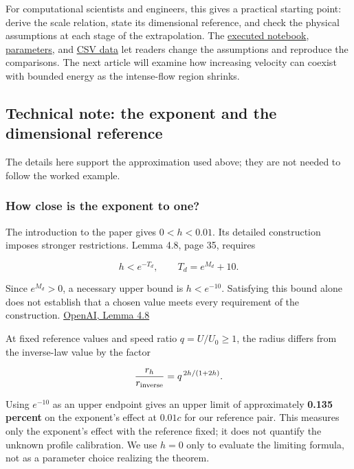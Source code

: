 \documentclass[
  english,
  11pt,
]{article}
\begin{document}
For computational scientists and engineers, this gives a practical
starting point: derive the scale relation, state its dimensional
reference, and check the physical assumptions at each stage of the
extrapolation. The \href{../../code/d1_core_size/study.ipynb}{executed
notebook}, \href{../../code/d1_core_size/parameters.json}{parameters},
and \href{../../code/d1_core_size/data/}{CSV data} let readers change
the assumptions and reproduce the comparisons. The next article will
examine how increasing velocity can coexist with bounded energy as the
intense-flow region shrinks.

\subsection{Technical note: the exponent and the dimensional
reference}\label{technical-note}

The details here support the approximation used above; they are not
needed to follow the worked example.

\subsubsection{How close is the exponent to
one?}\label{how-close-is-the-exponent-to-one}

The introduction to the paper gives \(0<h<0.01\). Its detailed
construction imposes stronger restrictions. Lemma 4.8, page 35, requires

\[
h<e^{-T_d},\qquad T_d=e^{M_d}+10.
\]

Since \(e^{M_d}>0\), a necessary upper bound is \(h<e^{-10}\).
Satisfying this bound alone does not establish that a chosen value meets
every requirement of the construction.
\href{https://cdn.openai.com/pdf/32d9f210-8b73-45e0-91bc-82a30aef8a9a/navier-stokes.pdf}{OpenAI,
Lemma 4.8}

At fixed reference values and speed ratio \(q=U/U_0\geq1\), the radius
differs from the inverse-law value by the factor

\[
\frac{r_h}{r_{\rm inverse}}=q^{\,2h/(1+2h)}.
\]

Using \(e^{-10}\) as an upper endpoint gives an upper limit of
approximately \textbf{0.135 percent} on the exponent's effect at
\(0.01c\) for our reference pair. This measures only the exponent's
effect with the reference fixed; it does not quantify the unknown
profile calibration. We use \(h=0\) only to evaluate the limiting
formula, not as a parameter choice realizing the theorem.
\end{document}
